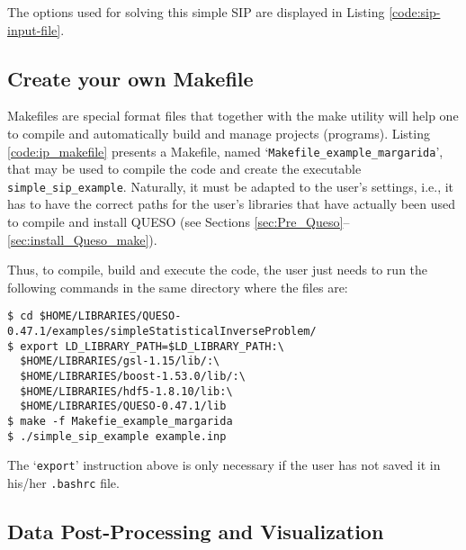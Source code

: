 The options used for solving this simple SIP are displayed in Listing \ref{code:sip-input-file}.





\subsection{Create your own Makefile}\label{sec:sip-makefile}

Makefiles are special format files that together with the make utility will help one to compile and automatically build and manage projects (programs).  
Listing \ref{code:ip_makefile} presents a Makefile, named `\texttt{Makefile\_example\_margarida}', that may be used to compile the code and create the executable \verb+simple_sip_example+. Naturally, it must be adapted to the user's settings, i.e., it has to have the correct paths for the user's libraries that have actually been used to compile and install QUESO  (see Sections \ref{sec:Pre_Queso}--\ref{sec:install_Queso_make}).



Thus, to compile, build and execute the code, the user just needs to run the following commands in the same directory where the files are:
\begin{lstlisting}
$ cd $HOME/LIBRARIES/QUESO-0.47.1/examples/simpleStatisticalInverseProblem/
$ export LD_LIBRARY_PATH=$LD_LIBRARY_PATH:\
  $HOME/LIBRARIES/gsl-1.15/lib/:\
  $HOME/LIBRARIES/boost-1.53.0/lib/:\
  $HOME/LIBRARIES/hdf5-1.8.10/lib:\
  $HOME/LIBRARIES/QUESO-0.47.1/lib 
$ make -f Makefie_example_margarida 
$ ./simple_sip_example example.inp
\end{lstlisting}

The `\verb+export+' instruction above is only necessary if the user has not saved it in his/her \verb+.bashrc+ file. 


\subsection{Data Post-Processing and Visualization}\label{sec:sip-results}


